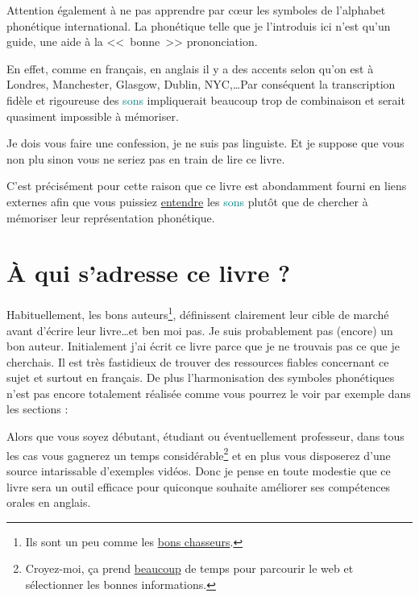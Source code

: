 Attention également à ne pas apprendre par c{\oe}ur les symboles de
l'alphabet phonétique international. La phonétique telle que je
l'introduis ici n'est qu'un guide, une aide à la <<~bonne~>>
prononciation.

En effet, comme en français, en anglais il y a des accents selon qu'on
est à Londres, Manchester, Glasgow, Dublin, NYC,\dots Par conséquent
la transcription fidèle et rigoureuse des \textcolor{teal}{sons}
impliquerait beaucoup trop de combinaison et serait quasiment
impossible à mémoriser.

Je dois vous faire une confession, je ne suis pas linguiste. Et je
suppose que vous non plu sinon vous ne seriez pas en train de lire ce
livre.

C'est précisément pour cette raison que ce livre est abondamment
fourni en liens externes afin que vous puissiez \underline{entendre}
les \textcolor{teal}{sons} plutôt que de chercher à mémoriser leur
représentation phonétique.

\newpage

\section{À qui s'adresse ce livre ?}\label{sec:for-who}

Habituellement, les bons auteurs\footnote{Ils sont un peu comme les
  \href{https://www.amazon.fr/gp/product/B0103QW256/ref=as_li_tl?ie=UTF8\&camp=1642\&creative=6746\&creativeASIN=B0103QW256\&linkCode=as2\&tag=wwwbecomefree-21\&linkId=0a96fb10b5f781c84d66ef5b92ea65b6}{bons
    chasseurs}.}, définissent clairement leur cible de marché avant
d'écrire leur livre\dots et ben moi pas. Je suis probablement pas
(encore) un bon auteur. Initialement j'ai écrit ce livre parce que je
ne trouvais pas ce que je cherchais. Il est très fastidieux de trouver
des ressources fiables concernant ce sujet et surtout en français. De
plus l'harmonisation des symboles phonétiques n'est pas encore
totalement réalisée comme vous pourrez le voir par exemple dans les
sections :

  

Alors que vous soyez débutant, étudiant ou éventuellement professeur,
dans tous les cas vous gagnerez un temps
considérable\footnote{Croyez-moi, ça prend \underline{beaucoup} de
temps pour parcourir le web et sélectionner les bonnes informations.}
et en plus vous disposerez d'une source intarissable d'exemples
vidéos. Donc je pense en toute modestie que ce livre sera un outil
efficace pour quiconque souhaite améliorer ses compétences orales en anglais.

